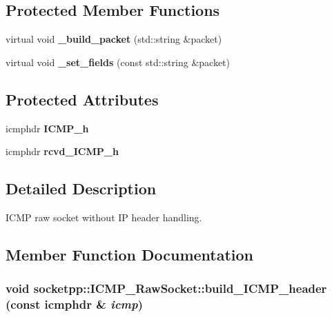 \subsection*{Protected Member Functions}
\begin{CompactItemize}
\item 
\hypertarget{classsocketpp_1_1ICMP__RawSocket_d8aa8d45c57eb77ab99ee84f1c5dd7da}{
virtual void \textbf{\_\-build\_\-packet} (std::string \&packet)}
\label{classsocketpp_1_1ICMP__RawSocket_d8aa8d45c57eb77ab99ee84f1c5dd7da}

\item 
\hypertarget{classsocketpp_1_1ICMP__RawSocket_e183b11c080f5d74dbc386ec53e7feb5}{
virtual void \textbf{\_\-set\_\-fields} (const std::string \&packet)}
\label{classsocketpp_1_1ICMP__RawSocket_e183b11c080f5d74dbc386ec53e7feb5}

\end{CompactItemize}
\subsection*{Protected Attributes}
\begin{CompactItemize}
\item 
\hypertarget{classsocketpp_1_1ICMP__RawSocket_31f1ab3a8beaf8d4cb5b192e644e3f33}{
icmphdr \textbf{ICMP\_\-h}}
\label{classsocketpp_1_1ICMP__RawSocket_31f1ab3a8beaf8d4cb5b192e644e3f33}

\item 
\hypertarget{classsocketpp_1_1ICMP__RawSocket_1304716643ef2274b8c1c195359110c6}{
icmphdr \textbf{rcvd\_\-ICMP\_\-h}}
\label{classsocketpp_1_1ICMP__RawSocket_1304716643ef2274b8c1c195359110c6}

\end{CompactItemize}


\subsection{Detailed Description}
ICMP raw socket without IP header handling. 

\subsection{Member Function Documentation}
\hypertarget{classsocketpp_1_1ICMP__RawSocket_7d8d54d4771f4012246835819421fbeb}{
\subsubsection[{build\_\-ICMP\_\-header}]{\setlength{\rightskip}{0pt plus 5cm}void socketpp::ICMP\_\-RawSocket::build\_\-ICMP\_\-header (const icmphdr \& {\em icmp})}}
\label{classsocketpp_1_1ICMP__RawSocket_7d8d54d4771f4012246835819421fbeb}


